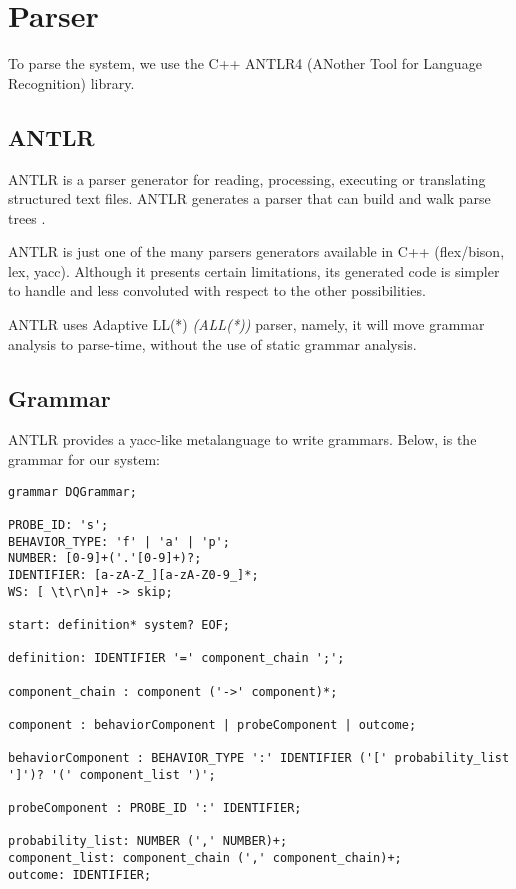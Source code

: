 \section{Parser}
        To parse the system, we use the C++ ANTLR4 (ANother Tool for Language Recognition) library. 
        \subsection{ANTLR}
    ANTLR is a parser generator for reading, processing, executing or translating structured text files. ANTLR generates a parser that can build and walk parse trees \cite{antlr4}.

 ANTLR is just one of the many parsers generators available in C++ (flex/bison, lex, yacc). Although it presents certain limitations, its generated code is simpler to handle and less convoluted with respect to the other possibilities.

        ANTLR uses Adaptive LL(*) \textit{(ALL(*))} parser, namely, it will move grammar analysis to parse-time, without the use of static grammar analysis. \cite{antlr}

        \subsection{Grammar}
            ANTLR provides a yacc-like metalanguage \cite{antlr} to write grammars. Below, is the grammar for our system:
            \begin{verbatim} 
grammar DQGrammar;

PROBE_ID: 's';
BEHAVIOR_TYPE: 'f' | 'a' | 'p';
NUMBER: [0-9]+('.'[0-9]+)?;
IDENTIFIER: [a-zA-Z_][a-zA-Z0-9_]*;
WS: [ \t\r\n]+ -> skip;

start: definition* system? EOF;

definition: IDENTIFIER '=' component_chain ';';

component_chain : component ('->' component)*;

component : behaviorComponent | probeComponent | outcome;

behaviorComponent : BEHAVIOR_TYPE ':' IDENTIFIER ('[' probability_list ']')? '(' component_list ')';

probeComponent : PROBE_ID ':' IDENTIFIER;

probability_list: NUMBER (',' NUMBER)+;
component_list: component_chain (',' component_chain)+;
outcome: IDENTIFIER;
\end{verbatim}
             
